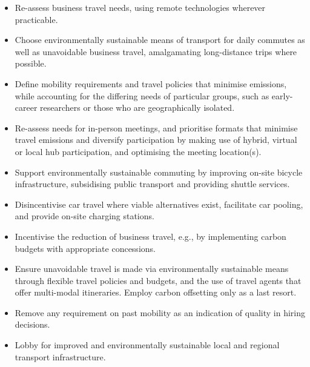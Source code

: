 \documentclass[../SustainableHEP.tex]{subfiles}
\begin{document}
\newpage
\begin{reco2}{\currentname}
{
\begin{itemize}[leftmargin=6 mm]
\setlength{\itemsep}{4pt}
\item Re-assess business travel needs, using remote technologies wherever practicable.
\item Choose environmentally sustainable means of transport for daily commutes as well as unavoidable business travel, amalgamating long-distance trips where possible.
\end{itemize}
}
{
\begin{itemize}[leftmargin=6 mm]
\setlength{\itemsep}{4pt}
\item Define mobility requirements and travel policies that minimise emissions, while accounting for the differing needs of particular groups, such as early-career researchers or those who are geographically isolated.

\item Re-assess needs for in-person meetings, and prioritise formats that minimise travel emissions and diversify participation by making use of hybrid, virtual or local hub participation, and optimising the meeting location(s).

\end{itemize}
}
{
\begin{itemize}[leftmargin=6 mm]
\setlength{\itemsep}{4pt}
\item Support environmentally sustainable commuting by improving on-site bicycle infrastructure, subsidising public transport and providing shuttle services.

\item Disincentivise car travel where viable alternatives exist, facilitate car pooling, and provide on-site charging stations.

\item Incentivise the reduction of business travel, e.g., by implementing carbon budgets with appropriate concessions.

\item Ensure unavoidable travel is made via environmentally sustainable means through flexible travel policies and budgets, and the use of travel agents that offer multi-modal itineraries.  Employ carbon offsetting only as a last resort.

\item Remove any requirement on past mobility as an indication of quality in hiring decisions. 

\item Lobby for improved and environmentally sustainable local and regional transport infrastructure.

\end{itemize}
}
\end{reco2}
\end{document}
